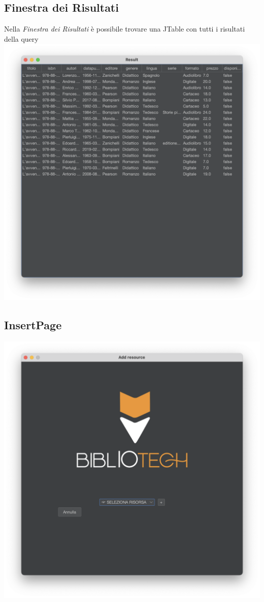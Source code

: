  \subsection{Finestra dei Risultati}
 Nella \textit{Finestra dei Risultati} è possibile trovare una JTable con tutti i risultati della query
 \\
 \includegraphics[scale=0.25, center]{Immagini/Schermate/Search/ResultPage.png}

 \subsection{InsertPage}
 \includegraphics[scale=0.25, center]{Immagini/Schermate/Insert/InserisciRisorsaPage.png}

